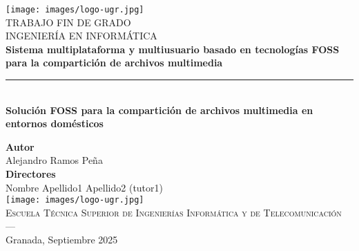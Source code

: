 \begin{titlepage}
 
 
\newlength{\centeroffset}
\setlength{\centeroffset}{-0.5\oddsidemargin}
\addtolength{\centeroffset}{0.5\evensidemargin}
\thispagestyle{empty}

\noindent\hspace*{\centeroffset}\begin{minipage}{\textwidth}

\centering
\texttt{[image: images/logo-ugr.jpg]}\\[1.4cm]

\textsc{ \Large TRABAJO FIN DE GRADO\\[0.2cm]}
\textsc{ INGENIERÍA EN INFORMÁTICA}\\[1cm]
% 
{\Huge\bfseries Sistema multiplataforma y multiusuario basado en tecnologías FOSS para la compartición de archivos multimedia\\
}
\noindent\rule[-1ex]{\textwidth}{3pt}\\[3.5ex]
{\large\bfseries Solución FOSS para la compartición de archivos multimedia en entornos domésticos\\[1.5cm]}
\end{minipage}

\vspace{2.5cm}
\noindent\hspace*{\centeroffset}\begin{minipage}{\textwidth}
\centering

\textbf{Autor}\\ {Alejandro Ramos Peña}\\[2.5ex]
\textbf{Directores}\\
{Nombre Apellido1 Apellido2 (tutor1)}\\[2cm]
\texttt{[image: images/logo-ugr.jpg]}\\[0.1cm]
\textsc{Escuela Técnica Superior de Ingenierías Informática y de Telecomunicación}\\
\textsc{---}\\
Granada, Septiembre 2025
\end{minipage}
\end{titlepage}


